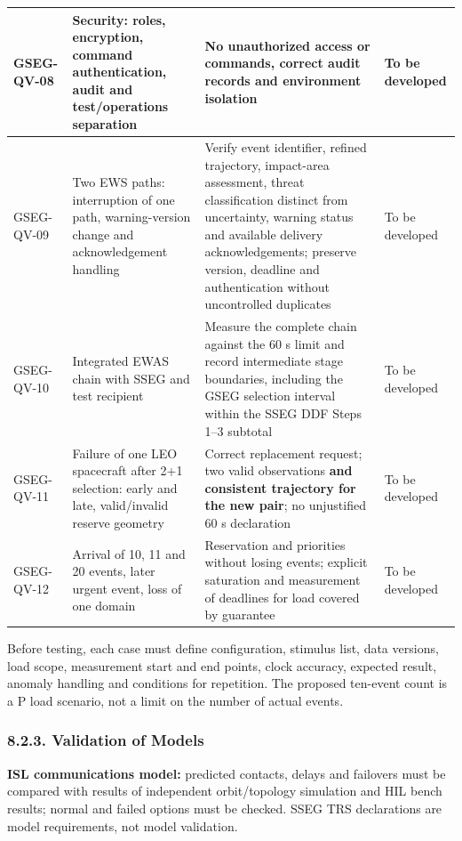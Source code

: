 \begin{longtable}{|P{0.14}|P{0.33}|P{0.33}|P{0.20}|}
GSEG-QV-08 & Security: roles, encryption, command authentication, audit and test/\allowbreak{}operations separation & No unauthorized access or commands, correct audit records and environment isolation & To be developed\\ \hline
GSEG-QV-09 & Two EWS paths: interruption of one path, warning-version change and acknowledgement handling & Verify event identifier, refined trajectory, impact-area assessment, threat classification distinct from uncertainty, warning status and available delivery acknowledgements; preserve version, deadline and authentication without uncontrolled duplicates & To be developed\\ \hline
GSEG-QV-10 & Integrated EWAS chain with SSEG and test recipient & Measure the complete chain against the 60 s limit and record intermediate stage boundaries, including the GSEG selection interval within the SSEG DDF Steps 1--3 subtotal & To be developed\\ \hline
GSEG-QV-11 & Failure of one LEO spacecraft after 2+1 selection: early and late, valid/\allowbreak{}invalid reserve geometry & Correct replacement request; two valid observations \textbf{and consistent trajectory for the new pair}; no unjustified 60 s declaration & To be developed\\ \hline
GSEG-QV-12 & Arrival of 10, 11 and 20 events, later urgent event, loss of one domain & Reservation and priorities without losing events; explicit saturation and measurement of deadlines for load covered by guarantee & To be developed\\*
\end{longtable}
\endgroup

Before testing, each case must define configuration, stimulus list, data versions, load scope, measurement start and end points, clock accuracy, expected result, anomaly handling and conditions for repetition. The proposed ten-event count is a P load scenario, not a limit on the number of actual events.

\subsubsection{8.2.3. Validation of Models}\label{ddjf-8-2-3}

\textbf{ISL communications model:} predicted contacts, delays and failovers must be compared with results of independent orbit/\allowbreak{}topology simulation and HIL bench results; normal and failed options must be checked. SSEG TRS declarations are model requirements, not model validation.

